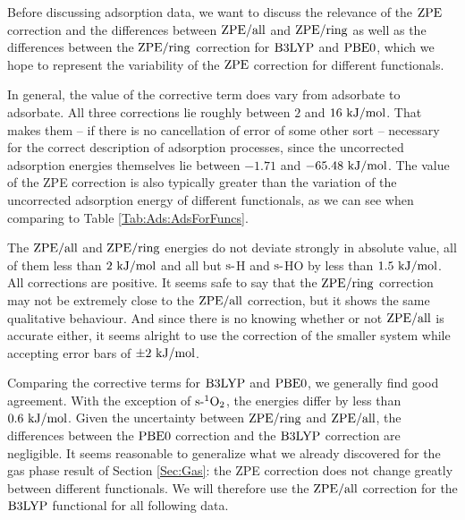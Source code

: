 \documentclass[8.5pt,twoside,twocolumn]{article}
\newcommand\zpe{\enmat{\te{ZPE}}}
\newcommand\zpering{\enmat{\zpe/\te{ring}}}
\newcommand\zpeall{\enmat{\zpe/\te{all}}}
\newcommand\sur{\enmat{\te{s-}}}
\newcommand\singot{\enmat{{^1\ot}}}
\newcommand\kmo{\enmat{\te {kJ/mol}}}
\theoremstyle{standard}
\begin{document}

Before discussing adsorption data, we want to discuss the relevance of the
$\zpe$ correction and the differences between $\zpeall$ and $\zpering$
as well as the differences between the $\zpering$ correction for $\text{B3LYP}$ and
$\text{PBE0}$, which we hope to represent the variability of the
$\zpe$ correction for different functionals.

In general, the value of the corrective term does vary from
adsorbate to adsorbate. All three corrections lie roughly between $2$
and $16~\kmo$. That makes them -- if there is no cancellation
of error of some other sort -- necessary for the correct description
of adsorption processes, since the uncorrected adsorption energies
themselves lie between $-1.71$ and $-65.48~\kmo$. The value of the 
ZPE correction is also typically greater than the variation of
the uncorrected adsorption energy of different functionals, as we
can see when comparing to Table \ref{Tab:Ads:AdsForFuncs}.

The $\zpeall$ and $\zpering$ energies
do not deviate strongly in absolute value, all of them less than $2~\kmo$
and all but $\sur$H and $\sur$HO by less than $1.5~\kmo$. All corrections are
positive.
It seems safe to say that the $\zpering$ correction may not be extremely
close to the $\zpeall$ correction, but it shows the same qualitative
behaviour. And since there is no knowing whether or not $\zpeall$ is
accurate either, it seems alright to use the correction of the smaller
system while accepting error bars of $\pm 2~\kmo$.

Comparing the corrective terms for $\text{B3LYP}$ and $\text{PBE0}$, we generally find
good agreement. With the exception of $\sur\singot$, the energies
differ by less than $0.6~\kmo$.
Given the uncertainty between $\zpering$ and $\zpeall$, the differences
between the  $\text{PBE0}$ correction and the $\text{B3LYP}$ correction are negligible.
It seems reasonable to generalize what we already discovered for the gas
phase result of Section \ref{Sec:Gas}: the ZPE correction does
not change greatly between different functionals. We will therefore
use the $\zpeall$ correction for the $\text{B3LYP}$ functional for all
following data.
\end{document}
